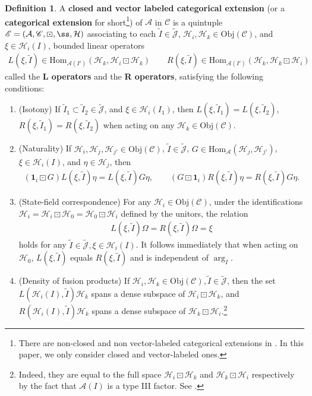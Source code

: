 \documentclass[11pt,b5paper,notitlepage]{article}
\theoremstyle{definition}
\newtheorem{df}{Definition}[section]
\theoremstyle{plain}
\newcommand{\mc}{\mathcal}
\newcommand{\wtd}{\widetilde}
\newcommand{\idt}{\mathbf{1}}
\newcommand{\Hom}{\mathrm{Hom}}
\newcommand{\scr}{\mathscr}
\newcommand{\Jtd}{\widetilde{\mathcal J}}
\newcommand{\Obj}{\mathrm{Obj}}
\numberwithin{equation}{section}
\begin{document}
\begin{df}\label{lb31}
A \textbf{closed and vector labeled categorical extension} (or a \textbf{categorical extension}  for short\footnote{There are non-closed and non vector-labeled categorical extensions in \cite{Gui21a}. In this paper, we only consider closed and vector-labeled ones.}) of $\mc A$  in $\scr C$ is a quintuple $\scr E=(\mc A,\scr C,\boxdot,\ss,\mc H)$ associating to each $\wtd I\in\wtd{\mc J}$, $\mc H_i,\mc H_k\in\Obj(\scr C)$, and $\xi\in\mc H_i(I)$, bounded linear operators
\begin{align*}
L(\xi,\wtd I)\in\Hom_{\mc A(I')}(\mc H_k,\mc H_i\boxdot\mc H_k)\qquad R(\xi,\wtd I)\in\Hom_{\mc A(I')}(\mc H_k,\mc H_k\boxdot\mc H_i)
\end{align*}
called the \textbf{L operators} and the \textbf{R operators}, satisfying the following conditions:
\begin{enumerate}[label=(\alph*)]
\item (Isotony) If $\wtd I_1\subset\wtd I_2\in\Jtd$, and $\xi\in\mc H_i(I_1)$, then $L(\xi,\wtd I_1)=L(\xi,\wtd I_2)$, $R(\xi,\wtd I_1)=R(\xi,\wtd I_2)$ when acting on any  $\mc H_k\in\Obj(\scr C)$.
\item (Naturality) If $\mc H_i,\mc H_j,\mc H_{j'}\in\Obj(\scr C)$, $\wtd I\in\Jtd$, $G\in\Hom_{\mc A}(\mc H_j,\mc H_{j'})$,  $\xi\in\mc H_i(I)$, and $\eta\in\mc H_j$, then
\begin{align}
	(\idt_i\boxdot G)L(\xi,\wtd I)\eta=L(\xi,\wtd I)G\eta,\qquad (G\boxdot \idt_i)R(\xi,\wtd I)\eta=R(\xi,\wtd I)G\eta.
\end{align}
\item (State-field correspondence) For any $\mc H_i\in\Obj(\scr C)$, under the identifications $\mc H_i=\mc H_i\boxdot\mc H_0=\mc H_0\boxdot\mc H_i$ defined by the unitors, the relation
\begin{align}
	L(\xi,\wtd I)\Omega=R(\xi,\wtd I)\Omega=\xi\label{eq14}
\end{align}
holds for any $\wtd I\in\Jtd,\xi\in\mc H_i(I)$. It follows immediately that when acting on $\mc H_0$, $L(\xi,\wtd I)$ equals $R(\xi,\wtd I)$ and is independent of $\arg_I$.
\item (Density of fusion products) If $\mc H_i,\mc H_k\in\Obj(\scr C),\wtd I\in\Jtd$, then the set $L(\mc H_i(I),\wtd I)\mc H_k$ spans a dense subspace of $\mc H_i\boxdot\mc H_k$, and $R(\mc H_i(I),\wtd I)\mc H_k$ spans a dense subspace of $\mc H_k\boxdot\mc H_i$.\footnote{Indeed, they are equal to the full space $\mc H_i\boxdot\mc H_k$ and $\mc H_k\boxdot\mc H_i$ respectively by the fact that $\mc A(I)$ is a type III factor. See \cite[Lem. 6.1]{Gui21a}.}

\end{enumerate}
\end{df}
\end{document}
